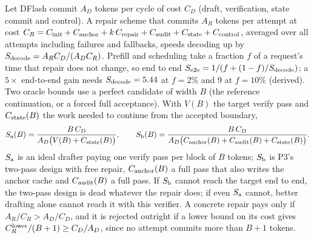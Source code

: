 Let DFlash commit $A_D$ tokens per cycle of cost $C_D$ (draft, verification, state commit and control). A repair scheme that commits $A_R$ tokens per attempt at cost $C_R=C_{\rm init}+C_{\rm anchor}+k\,C_{\rm repair}+C_{\rm audit}+C_{\rm state}+C_{\rm control}$, averaged over all attempts including failures and fallbacks, speeds decoding up by $S_{\rm decode}=A_RC_D/(A_DC_R)$. Prefill and scheduling take a fraction $f$ of a request's time that repair does not change, so end to end $S_{\rm e2e}=1/(f+(1-f)/S_{\rm decode})$; a $5\times$ end-to-end gain needs $S_{\rm decode}=5.44$ at $f=2\%$ and 9 at $f=10\%$ (derived). Two oracle bounds use a perfect candidate of width $B$ (the reference continuation, or a forced full acceptance). With $V(B)$ the target verify pass and $C_{\rm state}(B)$ the work needed to continue from the accepted boundary,
\begin{equation}\label{eq:repair-oracle}
S_{\rm a}(B)=\frac{B\,C_D}{A_D\bigl(V(B)+C_{\rm state}(B)\bigr)},\qquad
S_{\rm b}(B)=\frac{B\,C_D}{A_D\bigl(C_{\rm anchor}(B)+C_{\rm audit}(B)+C_{\rm state}(B)\bigr)}.
\end{equation}
$S_{\rm a}$ is an ideal drafter paying one verify pass per block of $B$ tokens; $S_{\rm b}$ is P3's two-pass design with free repair, $C_{\rm anchor}(B)$ a full pass that also writes the anchor cache and $C_{\rm audit}(B)$ a full pass. If $S_{\rm b}$ cannot reach the target end to end, the two-pass design is dead whatever the repair does; if even $S_{\rm a}$ cannot, better drafting alone cannot reach it with this verifier. A concrete repair pays only if $A_R/C_R>A_D/C_D$, and it is rejected outright if a lower bound on its cost gives $C_R^{\rm lower}/(B+1)\ge C_D/A_D$, since no attempt commits more than $B+1$ tokens.

